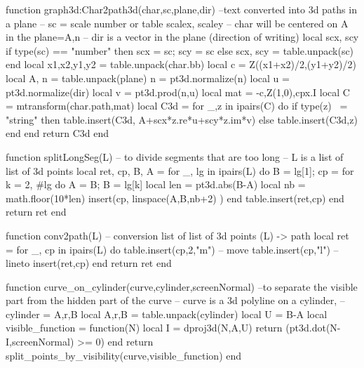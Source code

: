 \documentclass[border=5pt]{standalone}%
\begin{document}
\begin{luacode*}
function graph3d:Char2path3d(char,sc,plane,dir) --text converted into 3d paths in a plane
-- sc = scale number or table {scalex, scaley}
-- char will be centered on A in the plane={A,n}
-- dir is a vector in the plane (direction of writing)
    local scx, scy
    if type(sc) == "number" then 
        scx = sc; scy = sc
    else
        scx, scy = table.unpack(sc)
    end
    local x1,x2,y1,y2 = table.unpack(char.bb)
    local c = Z((x1+x2)/2,(y1+y2)/2)
    local A, n = table.unpack(plane)
    n = pt3d.normalize(n)
    local u = pt3d.normalize(dir)
    local v = pt3d.prod(n,u)
    local mat = {-c,Z(1,0),cpx.I} 
    local C = mtransform(char.path,mat)
    local C3d = {}
    for _,z in ipairs(C) do
        if type(z) ~= "string" then table.insert(C3d, A+scx*z.re*u+scy*z.im*v)
        else table.insert(C3d,z)
        end
    end
    return C3d
end

function splitLongSeg(L) -- to divide segments that are too long
    -- L is a list of list of 3d points
    local ret, cp, B, A = {}
    for _, lg in ipairs(L) do
        B = lg[1]; cp = {}
        for k = 2, #lg do
            A = B; B = lg[k]
            local len = pt3d.abs(B-A)
            local nb = math.floor(10*len)
            insert(cp, linspace(A,B,nb+2) )
        end
        table.insert(ret,cp)
    end
    return ret
end

function conv2path(L) -- conversion list of list of 3d points (L) -> path
    local ret = {} 
    for _, cp in ipairs(L) do
        table.insert(cp,2,"m") -- move
        table.insert(cp,"l")  -- lineto
        insert(ret,cp)
    end
    return ret
end

function curve_on_cylinder(curve,cylinder,screenNormal) --to separate the visible part from the hidden part of the curve
-- curve is a 3d polyline on a cylinder,
-- cylinder = {A,r,B}
    local A,r,B = table.unpack(cylinder)
    local U = B-A
    local visible_function = function(N)
        local I = dproj3d(N,{A,U})
        return (pt3d.dot(N-I,screenNormal) >= 0)
    end
    return split_points_by_visibility(curve,visible_function)
end
\end{luacode*}
\end{document}
